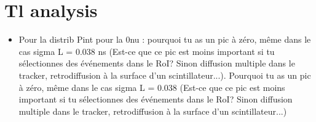 \documentclass[a4paper,12pt, twoside]{memoir}   	%
\begin{document}
               \chapter{Tl analysis}
               \begin{itemize}
               \item Pour la distrib Pint pour la 0nu : pourquoi tu as un pic à zéro, même dans le cas sigma L = 0.038 ns (Est-ce que ce pic est moins important si tu sélectionnes des événements dans le RoI? Sinon diffusion multiple dans le tracker, retrodiffusion à la surface d'un scintillateur...). Pourquoi tu as un pic à zéro, même dans le cas sigma L = 0.038 (Est-ce que ce pic est moins important si tu sélectionnes des événements dans le RoI? Sinon diffusion multiple dans le tracker, retrodiffusion à la surface d'un scintillateur...)
               \end{itemize}

               
\end{document}
